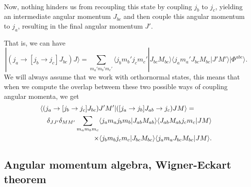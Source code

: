 \documentclass[%
twoside,                 %
final,                   %
10pt]{article}
\begin{document}
\paragraph{}
Now, nothing hinders us from recoupling this state by coupling $j_b$ to $j_c$, yielding an intermediate angular momentum $J_{bc}$ and then couple this angular momentum to $j_a$, resulting in the final angular momentum $J'$. 

That is, we can have 
\[
| (j_a\rightarrow [j_b\rightarrow j_c]J_{bc}) J\rangle = \sum_{m_a'm_b'm_c'}\langle j_bm_b'j_cm_c'|J_{bc}M_{bc}\rangle \langle j_am_a'J_{bc}M_{bc}|J'M'\rangle|\Phi^{abc}\rangle .
\]
We will always assume that we work with orthornormal states, this means that when we compute the overlap betweem these two possible ways of coupling angular momenta, we get 
\begin{eqnarray}
\nonumber
\lefteqn{ \langle (j_a\rightarrow [j_b\rightarrow j_c]J_{bc}) J'M'| ([j_a\rightarrow j_b]J_{ab}\rightarrow j_c) JM\rangle = } \\
\nonumber
& & \delta_{JJ'}\delta_{MM'}\sum_{m_am_bm_c}\langle j_am_aj_bm_b|J_{ab}M_{ab}\rangle \langle J_{ab}M_{ab}j_cm_c|JM\rangle \\
& & \times \langle j_bm_bj_cm_c|J_{bc}M_{bc}\rangle \langle j_am_aJ_{bc}M_{bc}|JM\rangle . \nonumber
\end{eqnarray}



\subsection*{Angular momentum algebra, Wigner-Eckart theorem}

\end{document}
